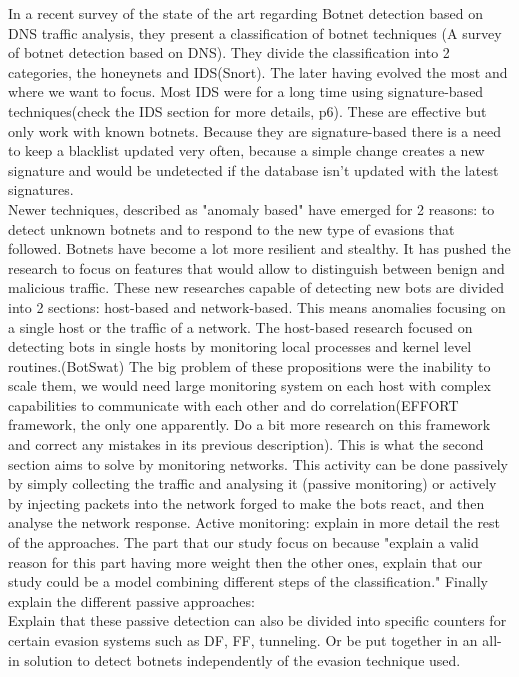 In a recent survey of the state of the art regarding Botnet detection based on DNS traffic analysis\cite{survey}, they present a classification of botnet techniques (A survey of botnet detection based on DNS). They divide the classification into 2 categories, the honeynets and IDS(Snort). The later having evolved the most and where we want to focus. Most IDS were for a long time using signature-based techniques(check the IDS section for more details, p6). These are effective but only work with known botnets. Because they are signature-based there is a need to keep a blacklist updated very often, because a simple change creates a new signature and would be undetected if the database isn't updated with the latest signatures.\\
Newer techniques, described as "anomaly based" have emerged for 2 reasons: to detect unknown botnets and to respond to the new type of evasions that followed. Botnets have become a lot more resilient and stealthy. It has pushed the research to focus on features that would allow to distinguish between benign and malicious traffic.
These new researches capable of detecting new bots are divided into 2 sections: host-based and network-based. This means anomalies focusing on a single host or the traffic of a network. The host-based research focused on detecting bots in single hosts by monitoring local processes and kernel level routines.(BotSwat) The big problem of these propositions were the inability to scale them, we would need large monitoring system on each host with complex capabilities to communicate with each other and do correlation(EFFORT framework, the only one apparently. Do a bit more research on this framework and correct any mistakes in its previous description). This is what the second section aims to solve by monitoring networks. This activity can be done passively by simply collecting the traffic and analysing it (passive monitoring) or actively by injecting packets into the network forged to make the bots react, and then analyse the network response. 
Active monitoring: explain in more detail the rest of the approaches.
The part that our study focus on because "explain a valid reason for this part having more weight then the other ones, explain that our study could be a model combining different steps of the classification."
Finally explain the different passive approaches: 
\\
Explain that these passive detection can also be divided into specific counters for certain evasion systems such as DF, FF, tunneling. Or be put together in an all-in solution to detect botnets independently of the evasion technique used.
